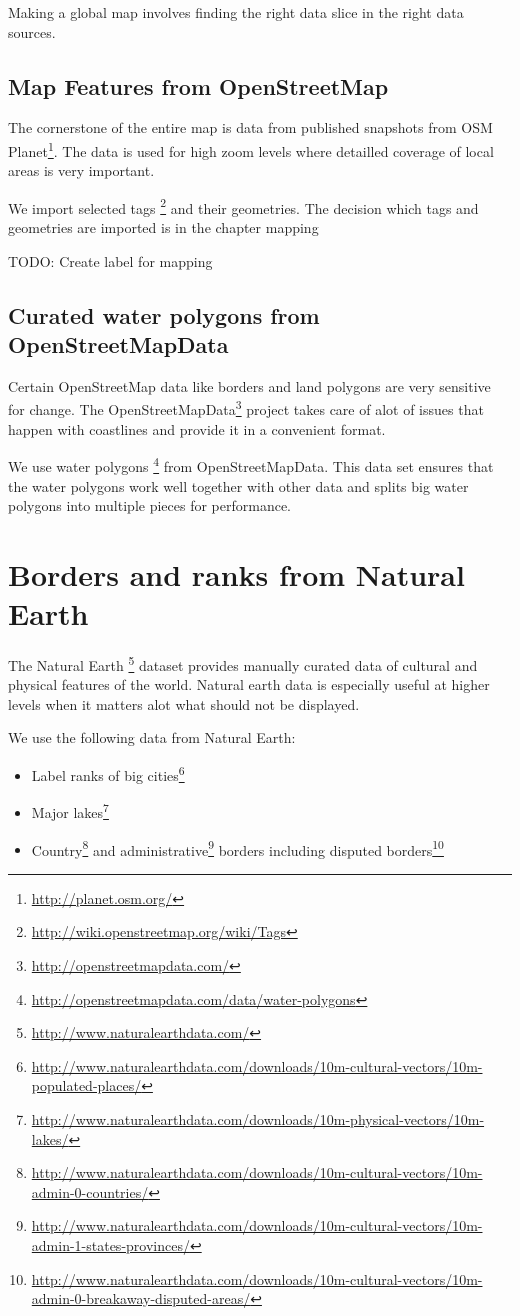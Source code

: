 Making a global map involves finding the right data slice in the right data sources.

\subsection{Map Features from OpenStreetMap}

The cornerstone of the entire map is \osm data from published snapshots from OSM Planet\footnote{\url{http://planet.osm.org/}}. The \osm{} data is used for high zoom levels where detailled coverage of local areas is very important.

We import selected tags \footnote{\url{http://wiki.openstreetmap.org/wiki/Tags}} and their geometries. The decision which tags and geometries are imported is in the chapter mapping

TODO: Create label for mapping

\subsection{Curated water polygons from OpenStreetMapData}

Certain OpenStreetMap data like borders and land polygons are very sensitive for change.
The OpenStreetMapData\footnote{\url{http://openstreetmapdata.com/}}
project takes care of alot of issues that happen with coastlines
and provide it in a convenient format.

We use water polygons \footnote{\url{http://openstreetmapdata.com/data/water-polygons}} from OpenStreetMapData. This data set ensures that the water polygons
work well together with other \osm{} data and splits big water polygons into multiple 
pieces for performance.

\section{Borders and ranks from Natural Earth}

The Natural Earth \footnote{\url{http://www.naturalearthdata.com/}} dataset provides manually curated data of cultural and physical features of the world. Natural earth data is especially useful at higher levels when it matters alot what should not be displayed.

We use the following data from Natural Earth:

\begin{itemize}
\item Label ranks of big cities\footnote{\url{http://www.naturalearthdata.com/downloads/10m-cultural-vectors/10m-populated-places/}}
\item Major lakes\footnote{\url{http://www.naturalearthdata.com/downloads/10m-physical-vectors/10m-lakes/}}
\item Country\footnote{\url{http://www.naturalearthdata.com/downloads/10m-cultural-vectors/10m-admin-0-countries/}} and administrative\footnote{\url{http://www.naturalearthdata.com/downloads/10m-cultural-vectors/10m-admin-1-states-provinces/}} borders including disputed borders\footnote{\url{http://www.naturalearthdata.com/downloads/10m-cultural-vectors/10m-admin-0-breakaway-disputed-areas/}}
\end{itemize}


